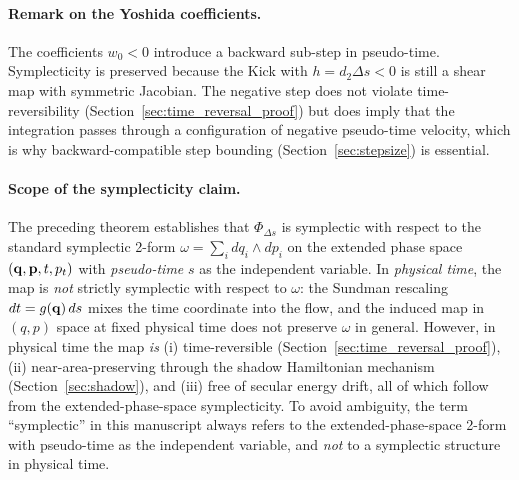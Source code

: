 \paragraph{Remark on the Yoshida coefficients.}
The coefficients $w_0 < 0$ introduce a backward sub-step in
pseudo-time. Symplecticity is preserved because the Kick with
$h = d_2\Delta s < 0$ is still a shear map with symmetric
Jacobian. The negative step does not violate time-reversibility
(Section~\ref{sec:time_reversal_proof}) but does imply that
the integration passes through a configuration of negative
pseudo-time velocity, which is why backward-compatible step
bounding (Section~\ref{sec:stepsize}) is essential.

\paragraph{Scope of the symplecticity claim.}
The preceding theorem establishes that $\Phi_{\Delta s}$ is
symplectic with respect to the standard symplectic 2-form
$\omega = \sum_i dq_i \wedge dp_i$ on the extended phase space
$(\mathbf{q}, \mathbf{p}, t, p_t)$ with \emph{pseudo-time} $s$ as the
independent variable.
In \emph{physical time}, the map is \emph{not} strictly
symplectic with respect to $\omega$: the Sundman rescaling
$dt = g(\mathbf{q})\,ds$ mixes the time coordinate into the flow,
and the induced map in $(q,p)$ space at fixed physical time
does not preserve $\omega$ in general.
However, in physical time the map \emph{is}
(i) time-reversible (Section~\ref{sec:time_reversal_proof}),
(ii) near-area-preserving through the shadow Hamiltonian
mechanism (Section~\ref{sec:shadow}), and
(iii) free of secular energy drift, all of which follow from
the extended-phase-space symplecticity.
To avoid ambiguity, the term ``symplectic'' in this manuscript
always refers to the extended-phase-space 2-form with pseudo-time
as the independent variable, and \emph{not} to a symplectic
structure in physical time.
